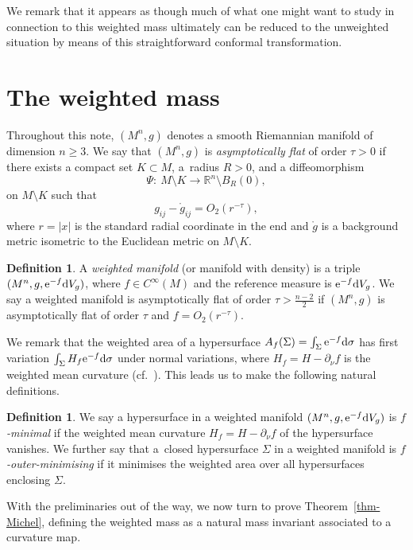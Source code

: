 \documentclass[10pt,a4paper]{amsart}
\numberwithin{equation}{section}
\theoremstyle{definition}
\newtheorem{Definition}[Theorem]{Definition}
\begin{document}
We remark that it appears as though much of what one might want to study in connection to this weighted mass ultimately can be reduced to the unweighted situation by means of this straightforward conformal transformation.



\section{The weighted mass}\label{sec-michel}

Throughout this note, $(M^n,g)$ denotes a smooth Riemannian manifold of dimension $n\geq3$. We say that $(M^n,g)$ is \emph{asymptotically flat} of order $\tau>0$ if there exists a compact set $K\subset M$, a~radius $R>0$, and a diffeomorphism
\[
\Psi \colon \  M\setminus K \longrightarrow \mathbb{R}^n\setminus B_R(0),
\]
on $M\setminus K$ such that
\[
g_{ij} - \mathring g_{ij} = O_2(r^{-\tau}),
\]
where $r=|x|$ is the standard radial coordinate in the end and $\mathring g$ is a background metric isometric to the Euclidean metric on $M\setminus K$.

\begin{Definition}\label{def-AF}
	A \emph{weighted manifold} (or manifold with density) is a triple $(M^n,g,{\rm e}^{-f}{\rm d}V_g)$, where $f\in C^\infty(M)$ and the reference measure is ${\rm e}^{-f}{\rm d}V_g$. We say a weighted manifold is asymptotically flat of order $\tau>\frac{n-2}{2}$ if $(M^n,g)$ is asymptotically flat of order $\tau$ and $f=O_2(r^{-\tau})$.
\end{Definition}

We remark that the weighted area of a hypersurface $A_f(\Sigma)=\int_\Sigma {\rm e}^{-f}{\rm d}\sigma$ has first variation $\int_\Sigma H_f {\rm e}^{-f}{\rm d}\sigma$ under normal variations, where $H_f=H-\partial_\nu f$ is the weighted mean curvature (cf.~\cite{BaldaufOzuch22}). This leads us to make the following natural definitions.
\begin{Definition} \label{def-weighted-min}
	We say a hypersurface in a weighted manifold $(M^n,g,{\rm e}^{-f}{\rm d}V_g)$ is \emph{$f$-minimal} if the weighted mean curvature $H_f=H-\partial_\nu f$ of the hypersurface vanishes. We further say that a~closed hypersurface $\Sigma$ in a weighted manifold is \emph{$f$-outer-minimising} if it minimises the weighted area over all hypersurfaces enclosing $\Sigma$.
\end{Definition}


With the preliminaries out of the way, we now turn to prove Theorem~\ref{thm-Michel}, defining the weighted mass as a natural mass invariant associated to a curvature map.
\end{document}
